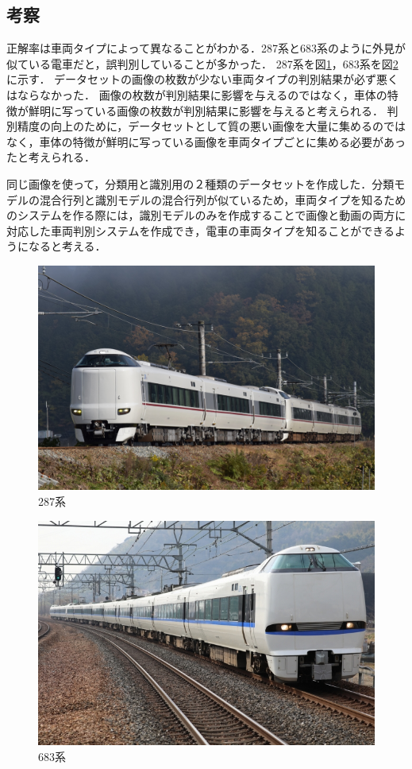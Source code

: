 \subsection{考察}
正解率は車両タイプによって異なることがわかる．287系と683系のように外見が似ている電車だと，誤判別していることが多かった．
287系を図\ref{fig:287}，683系を図\ref{fig:683}に示す．
データセットの画像の枚数が少ない車両タイプの判別結果が必ず悪くはならなかった．
画像の枚数が判別結果に影響を与えるのではなく，車体の特徴が鮮明に写っている画像の枚数が判別結果に影響を与えると考えられる．
判別精度の向上のために，データセットとして質の悪い画像を大量に集めるのではなく，車体の特徴が鮮明に写っている画像を車両タイプごとに集める必要があったと考えられる．

同じ画像を使って，分類用と識別用の２種類のデータセットを作成した．分類モデルの混合行列と識別モデルの混合行列が似ているため，車両タイプを知るためのシステムを作る際には，識別モデルのみを作成することで画像と動画の両方に対応した車両判別システムを作成でき，電車の車両タイプを知ることができるようになると考える．

\begin{figure}
	\centering
	\includegraphics[width=0.7\linewidth]{chap4/fig/287}
	\caption{287系}
	\label{fig:287}
\end{figure}

\begin{figure}
	\centering
	\includegraphics[width=0.7\linewidth]{chap4/fig/683}
	\caption{683系}
	\label{fig:683}
\end{figure}

